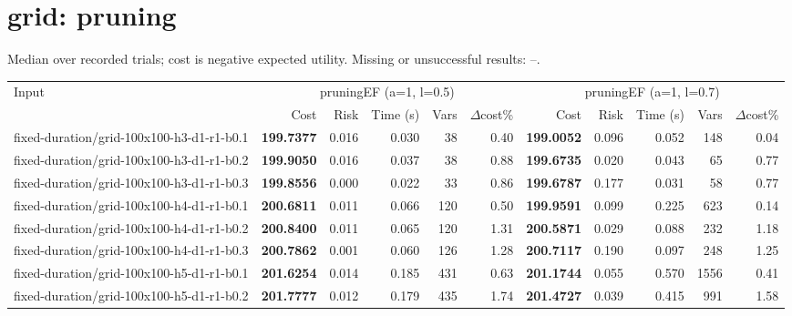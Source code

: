 \documentclass[10pt]{article}
\begin{document}
\section*{grid: pruning}
\noindent Median over recorded trials; cost is negative expected utility. Missing or unsuccessful results: --.\par
\small\begin{tabular}{p{65mm}rrrrrrrrrr}
\toprule
Input & \multicolumn{5}{c}{pruningEF (a=1, l=0.5)} & \multicolumn{5}{c}{pruningEF (a=1, l=0.7)} \\
 & Cost & Risk & Time (s) & Vars & $\Delta$cost\% & Cost & Risk & Time (s) & Vars & $\Delta$cost\% \\
\midrule
fixed-\allowbreak duration/\allowbreak grid-\allowbreak 100x100-\allowbreak h3-\allowbreak d1-\allowbreak r1-\allowbreak b0.1 & \textbf{199.7377} & 0.016 & 0.030 & 38 & 0.40 & \textbf{199.0052} & 0.096 & 0.052 & 148 & 0.04 \\
fixed-\allowbreak duration/\allowbreak grid-\allowbreak 100x100-\allowbreak h3-\allowbreak d1-\allowbreak r1-\allowbreak b0.2 & \textbf{199.9050} & 0.016 & 0.037 & 38 & 0.88 & \textbf{199.6735} & 0.020 & 0.043 & 65 & 0.77 \\
fixed-\allowbreak duration/\allowbreak grid-\allowbreak 100x100-\allowbreak h3-\allowbreak d1-\allowbreak r1-\allowbreak b0.3 & \textbf{199.8556} & 0.000 & 0.022 & 33 & 0.86 & \textbf{199.6787} & 0.177 & 0.031 & 58 & 0.77 \\
fixed-\allowbreak duration/\allowbreak grid-\allowbreak 100x100-\allowbreak h4-\allowbreak d1-\allowbreak r1-\allowbreak b0.1 & \textbf{200.6811} & 0.011 & 0.066 & 120 & 0.50 & \textbf{199.9591} & 0.099 & 0.225 & 623 & 0.14 \\
fixed-\allowbreak duration/\allowbreak grid-\allowbreak 100x100-\allowbreak h4-\allowbreak d1-\allowbreak r1-\allowbreak b0.2 & \textbf{200.8400} & 0.011 & 0.065 & 120 & 1.31 & \textbf{200.5871} & 0.029 & 0.088 & 232 & 1.18 \\
fixed-\allowbreak duration/\allowbreak grid-\allowbreak 100x100-\allowbreak h4-\allowbreak d1-\allowbreak r1-\allowbreak b0.3 & \textbf{200.7862} & 0.001 & 0.060 & 126 & 1.28 & \textbf{200.7117} & 0.190 & 0.097 & 248 & 1.25 \\
fixed-\allowbreak duration/\allowbreak grid-\allowbreak 100x100-\allowbreak h5-\allowbreak d1-\allowbreak r1-\allowbreak b0.1 & \textbf{201.6254} & 0.014 & 0.185 & 431 & 0.63 & \textbf{201.1744} & 0.055 & 0.570 & 1556 & 0.41 \\
fixed-\allowbreak duration/\allowbreak grid-\allowbreak 100x100-\allowbreak h5-\allowbreak d1-\allowbreak r1-\allowbreak b0.2 & \textbf{201.7777} & 0.012 & 0.179 & 435 & 1.74 & \textbf{201.4727} & 0.039 & 0.415 & 991 & 1.58 \\

\end{tabular}
\end{document}
